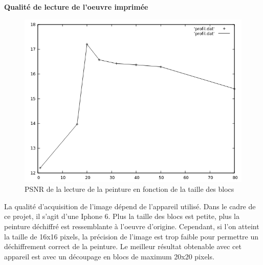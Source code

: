 \documentclass{beamer}
\begin{document}
\begin{frame}[t]
\begin{columns}[t]
\begin{column}{.49\linewidth}
                \begin{block}{\centering \textbf{Qualité de lecture de l'oeuvre imprimée}}
                    \begin{center}
                        \begin{figure}[t]
                            \includegraphics[width=.5\linewidth]{rsc/psnr_lecture.png}
                            \caption{PSNR de la lecture de la peinture en fonction de la taille des blocs}
                        \end{figure}
                    \end{center}

                    La qualité d'acquisition de l'image dépend de l'appareil utilisé. Dans le cadre de ce projet, il s'agit d'une Iphone 6.
                    Plus la taille des blocs est petite, plus la peinture déchiffré est ressemblante à l'oeuvre d'origine. Cependant, si l'on atteint la taille de 16x16 pixels, la précision de l'image est trop faible pour permettre un déchiffrement correct de la peinture.
                    Le meilleur résultat obtenable avec cet appareil est avec un découpage en blocs de maximum 20x20 pixels.
                \end{block}
            \end{column}
        \end{columns}
    \end{frame}
\end{document}
